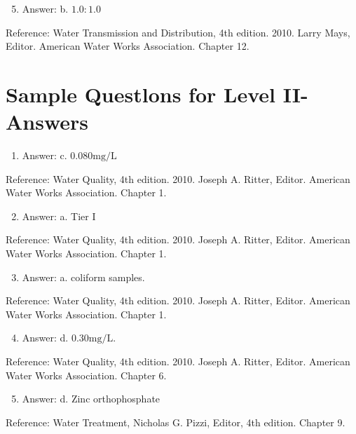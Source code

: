\documentclass[10pt]{article}
\begin{document}
\begin{enumerate}
  \setcounter{enumi}{4}
  \item Answer: b. $1.0: 1.0$
\end{enumerate}

Reference: Water Transmission and Distribution, 4th edition. 2010. Larry Mays, Editor. American Water Works Association. Chapter 12.

\section{Sample Questlons for Level II-Answers}
\begin{enumerate}
  \item Answer: c. $0.080 \mathrm{mg} / \mathrm{L}$
\end{enumerate}

Reference: Water Quality, 4th edition. 2010. Joseph A. Ritter, Editor. American Water Works Association. Chapter 1.

\begin{enumerate}
  \setcounter{enumi}{1}
  \item Answer: a. Tier I
\end{enumerate}

Reference: Water Quality, 4th edition. 2010. Joseph A. Ritter, Editor. American Water Works Association. Chapter 1.

\begin{enumerate}
  \setcounter{enumi}{2}
  \item Answer: a. coliform samples.
\end{enumerate}

Reference: Water Quality, 4th edition. 2010. Joseph A. Ritter, Editor. American Water Works Association. Chapter 1.

\begin{enumerate}
  \setcounter{enumi}{3}
  \item Answer: d. $0.30 \mathrm{mg} / \mathrm{L}$.
\end{enumerate}

Reference: Water Quality, 4th edition. 2010. Joseph A. Ritter, Editor. American Water Works Association. Chapter 6.

\begin{enumerate}
  \setcounter{enumi}{4}
  \item Answer: d. Zinc orthophosphate
\end{enumerate}

Reference: Water Treatment, Nicholas G. Pizzi, Editor, 4th edition. Chapter 9.
\end{document}
